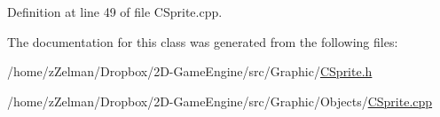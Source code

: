 Definition at line 49 of file C\-Sprite.\-cpp.



The documentation for this class was generated from the following files\-:\begin{DoxyCompactItemize}
\item 
/home/z\-Zelman/\-Dropbox/2\-D-\/\-Game\-Engine/src/\-Graphic/\hyperlink{CSprite_8h}{C\-Sprite.\-h}\item 
/home/z\-Zelman/\-Dropbox/2\-D-\/\-Game\-Engine/src/\-Graphic/\-Objects/\hyperlink{CSprite_8cpp}{C\-Sprite.\-cpp}\end{DoxyCompactItemize}
